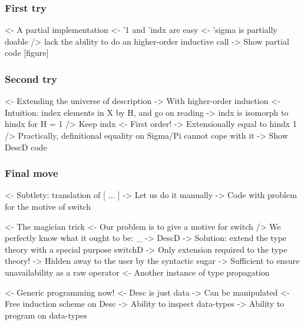 \documentclass{article}
\newenvironment{structure}{\footnotesize\verbatim}{\endverbatim}
\begin{document}
\subsubsection{First try}

\begin{structure}
<- A partial implementation
    <- '1 and 'indx are easy
    <- 'sigma is partially doable
        /> lack the ability to do an higher-order inductive call
    -> Show partial code [figure]
\end{structure}

\subsubsection{Second try}

\begin{structure}
<- Extending the universe of description
    -> With higher-order induction
    <- Intuition: index elements in X by H, and go on reading
        -> indx is isomorph to hindx for H = 1
    /> Keep indx
        <- First order!
        -> Extensionally equal to hindx 1
        /> Practically, definitional equality on Sigma/Pi cannot cope with it
    -> Show DescD code
\end{structure}

\subsubsection{Final move}

\begin{structure}
<- Subtlety: translation of [ ... ]
    -> Let us do it manually
        -> Code with problem for the motive of switch
\end{structure}

\begin{structure}
<- The magician trick
    <- Our problem is to give a motive for switch
        /> We perfectly know what it ought to be: \_ -> DescD
    -> Solution: extend the type theory with a special purpose switchD
        -> Only extension required to the type theory!
        -> Hidden away to the user by the syntactic sugar
            -> Sufficient to ensure unavailability as a raw operator
            <- Another instance of type propagation
\end{structure}

\begin{structure}
<- Generic programming now!
    <- Desc is just data
        -> Can be manipulated
    <- Free induction scheme on Desc
        -> Ability to inspect data-types
        -> Ability to program on data-types
\end{structure}
\end{document}
